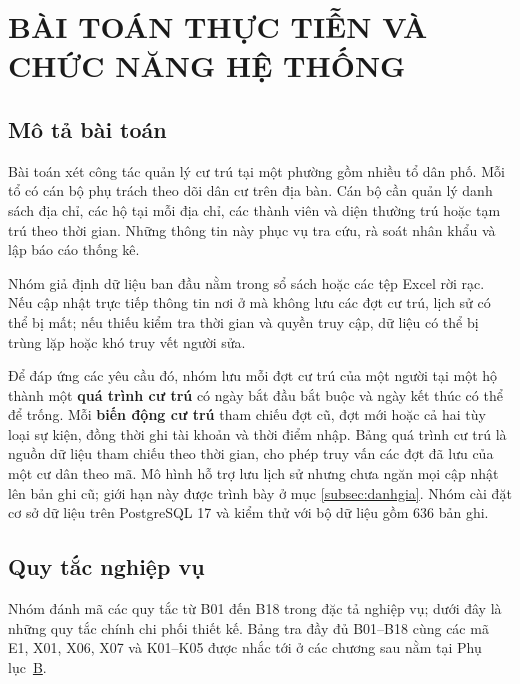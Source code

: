 \section[BÀI TOÁN THỰC TIỄN VÀ CHỨC NĂNG]{BÀI TOÁN THỰC TIỄN VÀ CHỨC NĂNG HỆ THỐNG}
\label{sec:chuong1}

\subsection{Mô tả bài toán}
\label{subsec:baitoan}

Bài toán xét công tác quản lý cư trú tại một phường gồm nhiều tổ dân phố. Mỗi tổ có cán bộ phụ trách theo dõi dân cư trên địa bàn. Cán bộ cần quản lý danh sách địa chỉ, các hộ tại mỗi địa chỉ, các thành viên và diện thường trú hoặc tạm trú theo thời gian. Những thông tin này phục vụ tra cứu, rà soát nhân khẩu và lập báo cáo thống kê.

Nhóm giả định dữ liệu ban đầu nằm trong sổ sách hoặc các tệp Excel rời rạc. Nếu cập nhật trực tiếp thông tin nơi ở mà không lưu các đợt cư trú, lịch sử có thể bị mất; nếu thiếu kiểm tra thời gian và quyền truy cập, dữ liệu có thể bị trùng lặp hoặc khó truy vết người sửa.

Để đáp ứng các yêu cầu đó, nhóm lưu mỗi đợt cư trú của một người tại một hộ thành một \textbf{quá trình cư trú} có ngày bắt đầu bắt buộc và ngày kết thúc có thể để trống. Mỗi \textbf{biến động cư trú} tham chiếu đợt cũ, đợt mới hoặc cả hai tùy loại sự kiện, đồng thời ghi tài khoản và thời điểm nhập. Bảng quá trình cư trú là nguồn dữ liệu tham chiếu theo thời gian, cho phép truy vấn các đợt đã lưu của một cư dân theo mã. Mô hình hỗ trợ lưu lịch sử nhưng chưa ngăn mọi cập nhật lên bản ghi cũ; giới hạn này được trình bày ở mục \ref{subsec:danhgia}. Nhóm cài đặt cơ sở dữ liệu trên PostgreSQL 17 và kiểm thử với bộ dữ liệu gồm 636 bản ghi.

\subsection{Quy tắc nghiệp vụ}
\label{subsec:quytac}

Nhóm đánh mã các quy tắc từ B01 đến B18 trong đặc tả nghiệp vụ; dưới đây là những quy tắc chính chi phối thiết kế. Bảng tra đầy đủ B01--B18 cùng các mã E1, X01, X06, X07 và K01--K05 được nhắc tới ở các chương sau nằm tại Phụ lục~\hyperref[sec:phuluc-ma]{B}.

